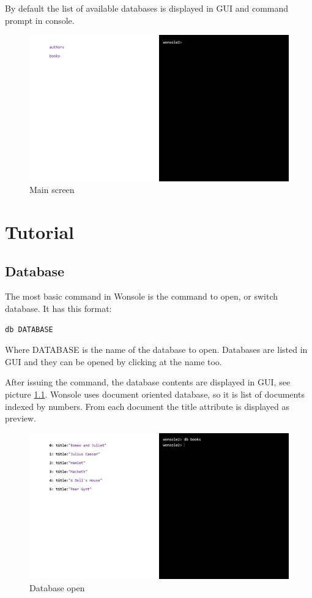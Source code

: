 \documentclass[10pt,a4paper,oneside]{report}
\begin{document}
By default the list of available databases is displayed in GUI and
command prompt in console.


\begin{figure}
\centering
\includegraphics[width=\textwidth]{screenshot/wonsole2/wonsole2-00.png}
\caption{Main screen}
\label{wonsole2-00}
\end{figure}

\chapter{Tutorial}

\section{Database}
The most basic command in Wonsole is the command to open, or switch database. It
has this format:
\begin{verbatim}
db DATABASE
\end{verbatim}
Where DATABASE is the name of the database to open. Databases are listed in GUI
and they can be opened by clicking at the name too.

After issuing the command, the database contents are displayed in GUI, see
picture \ref{wonsole2-02}.
Wonsole uses document oriented database, so it is list of documents indexed by numbers.
From each document the title attribute is displayed as preview.


\begin{figure}
\centering
\includegraphics[width=\textwidth]{screenshot/wonsole2/wonsole2-02.png}
\caption{Database open}
\label{wonsole2-02}
\end{figure}
\end{document}
